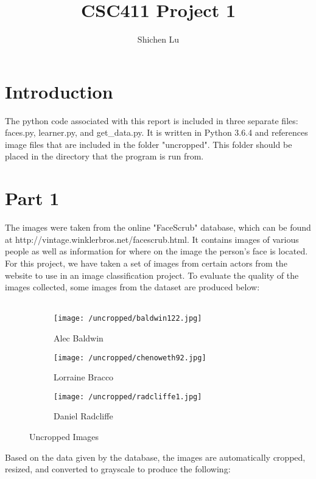 \documentclass[11pt,a4paper]{report}
\author{Shichen Lu}
\title{CSC411 Project 1}
\begin{document}
\maketitle
\section*{Introduction}
The python code associated with this report is included in three separate files: faces.py, learner.py, and get\_data.py. It is written in Python 3.6.4 and references image files that are included in the folder "uncropped". This folder should be placed in the directory that the program is run from.

\section*{Part 1}
The images were taken from the online "FaceScrub" database, which can be found at http://vintage.winklerbros.net/facescrub.html. It contains images of various 	people as well as information for where on the image the person's face is located. For this project, we have taken a set of images from certain actors from the website to use in an image classification project. To evaluate the quality of the images collected, some images from the dataset are produced below:\\\\


\begin{figure}[h]
\centering
\begin{subfigure}{.3\textwidth}
  \centering
  \texttt{[image: /uncropped/baldwin122.jpg]}
  \caption{Alec Baldwin}
  \label{fig:sub1}
\end{subfigure}%
\begin{subfigure}{.3\textwidth}
  \centering
  \texttt{[image: /uncropped/chenoweth92.jpg]}
  \caption{Lorraine Bracco}
  \label{fig:sub2}
\end{subfigure}
\begin{subfigure}{.3\textwidth}
  \centering
  \texttt{[image: /uncropped/radcliffe1.jpg]}
  \caption{Daniel Radcliffe}
  \label{fig:sub2}
\end{subfigure}
\caption{Uncropped Images}
\label{fig:test}
\end{figure}	

Based on the data given by the database, the images are automatically cropped, resized, and converted to grayscale to produce the following:
\end{document}
